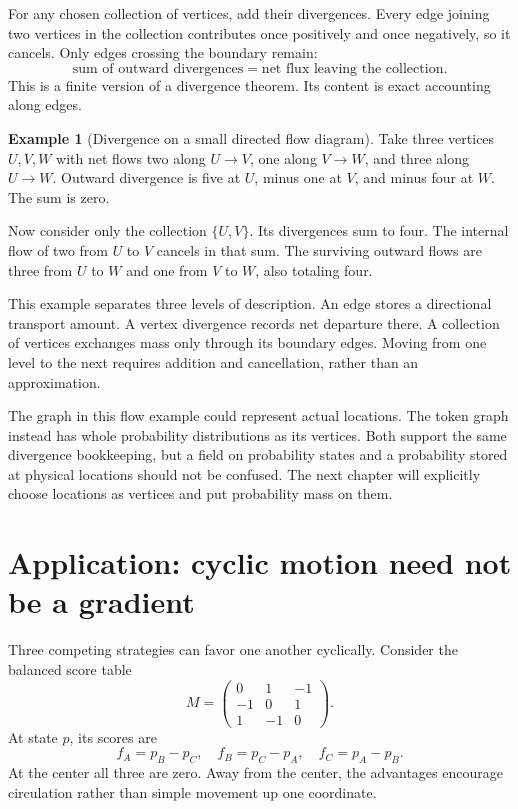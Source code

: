 \documentclass[11pt,oneside,openany]{book}
\theoremstyle{definition}
\newtheorem{example}{Example}[chapter]
\theoremstyle{remark}
\numberwithin{equation}{chapter}
\begin{document}
For any chosen collection of vertices, add their divergences. Every edge joining two vertices in the collection contributes once positively and once negatively, so it cancels. Only edges crossing the boundary remain: \[\boxed{\text{sum of outward divergences}
=\text{net flux leaving the collection}.}\] This is a finite version of a divergence theorem. Its content is exact accounting along edges.

\begin{example}[Divergence on a small directed flow diagram]

Take three vertices \(U,V,W\) with net flows two along \(U\to V\), one along \(V\to W\), and three along \(U\to W\). Outward divergence is five at \(U\), minus one at \(V\), and minus four at \(W\). The sum is zero.

Now consider only the collection \(\{U,V\}\). Its divergences sum to four. The internal flow of two from \(U\) to \(V\) cancels in that sum. The surviving outward flows are three from \(U\) to \(W\) and one from \(V\) to \(W\), also totaling four.

\end{example}

This example separates three levels of description. An edge stores a directional transport amount. A vertex divergence records net departure there. A collection of vertices exchanges mass only through its boundary edges. Moving from one level to the next requires addition and cancellation, rather than an approximation.

The graph in this flow example could represent actual locations. The token graph instead has whole probability distributions as its vertices. Both support the same divergence bookkeeping, but a field on probability states and a probability stored at physical locations should not be confused. The next chapter will explicitly choose locations as vertices and put probability mass on them.

\section{Application: cyclic motion need not be a gradient}\label{ch03-application-cyclic-motion-need-not-be-a-gradient}

Three competing strategies can favor one another cyclically. Consider the balanced score table \[M=\begin{pmatrix}0&1&-1\\-1&0&1\\1&-1&0\end{pmatrix}.\] At state \(p\), its scores are \[f_A=p_B-p_C,\quad f_B=p_C-p_A,\quad f_C=p_A-p_B.\] At the center all three are zero. Away from the center, the advantages encourage circulation rather than simple movement up one coordinate.
\end{document}

